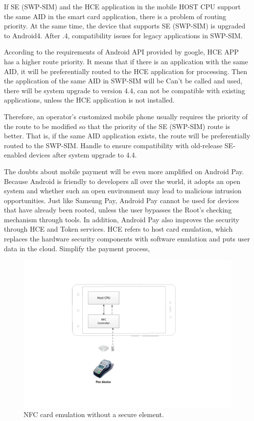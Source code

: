 \documentclass[journal]{IEEEtran}
\begin{document}
If SE (SWP-SIM) and the HCE application in the mobile HOST CPU support the same AID in the smart card application, there is a problem of routing priority. At the same time, the device that supports SE (SWP-SIM) is upgraded to Android4. After .4, compatibility issues for legacy applications in SWP-SIM.

According to the requirements of Android API provided by google, HCE APP has a higher route priority. It means that if there is an application with the same AID, it will be preferentially routed to the HCE application for processing. Then the application of the same AID in SWP-SIM will be Can't be called and used, there will be system upgrade to version 4.4, can not be compatible with existing applications, unless the HCE application is not installed.

Therefore, an operator's customized mobile phone usually requires the priority of the route to be modified so that the priority of the SE (SWP-SIM) route is better. That is, if the same AID application exists, the route will be preferentially routed to the SWP-SIM. Handle to ensure compatibility with old-release SE-enabled devices after system upgrade to 4.4.


The doubts about mobile payment will be even more amplified on Android Pay. Because Android is friendly to developers all over the world, it adopts an open system and whether such an open environment may lead to malicious intrusion opportunities. Just like Samsung Pay, Android Pay cannot be used for devices that have already been rooted, unless the user bypasses the Root's checking mechanism through tools. In addition, Android Pay also improves the security through HCE and Token services. HCE refers to host card emulation, which replaces the hardware security components with software emulation and puts user data in the cloud. Simplify the payment process,

\begin{figure}[htbp]
\centerline{\includegraphics[scale=0.58]{NFC_cpu.pdf}}
\caption{NFC card emulation without a secure element.}
\label{fig}
\end{figure}
\end{document}

